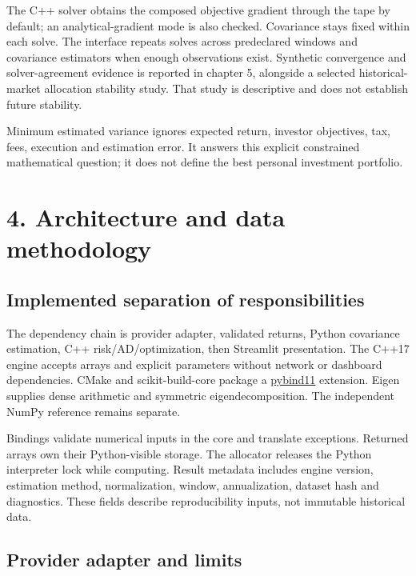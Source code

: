 \documentclass[
  american,
  11pt,
]{article}
\begin{document}
The C++ solver obtains the composed objective gradient through the tape
by default; an analytical-gradient mode is also checked. Covariance
stays fixed within each solve. The interface repeats solves across
predeclared windows and covariance estimators when enough observations
exist. Synthetic convergence and solver-agreement evidence is reported
in chapter 5, alongside a selected historical-market allocation stability study.
That study is descriptive and does not establish future stability.

Minimum estimated variance ignores expected return, investor objectives,
tax, fees, execution and estimation error. It answers this explicit
constrained mathematical question; it does not define the best personal
investment portfolio.

\section{4. Architecture and data
methodology}\label{architecture-and-data-methodology}

\subsection{Implemented separation of
responsibilities}\label{implemented-separation-of-responsibilities}

The dependency chain is provider adapter, validated returns, Python
covariance estimation, C++ risk/AD/optimization, then Streamlit
presentation. The C++17 engine accepts arrays and explicit parameters
without network or dashboard dependencies. CMake and scikit-build-core
package a \href{https://pybind11.readthedocs.io/en/stable/}{pybind11}
extension. Eigen supplies dense arithmetic and symmetric
eigendecomposition. The independent NumPy reference remains separate.

Bindings validate numerical inputs in the core and translate exceptions.
Returned arrays own their Python-visible storage. The allocator releases
the Python interpreter lock while computing. Result metadata includes
engine version, estimation method, normalization, window, annualization,
dataset hash and diagnostics. These fields describe reproducibility
inputs, not immutable historical data.

\subsection{Provider adapter and
limits}\label{provider-adapter-and-limits}
\end{document}
